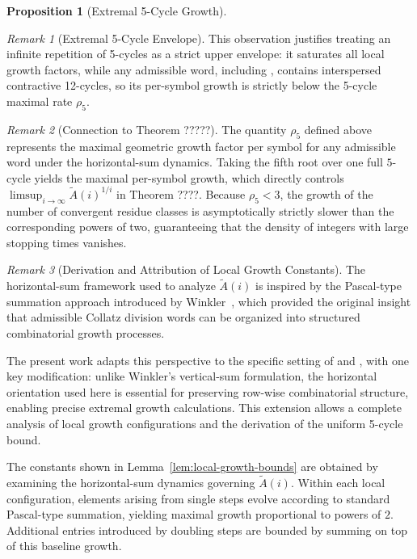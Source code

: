 \documentclass[12pt, oneside]{article}
\numberwithin{equation}{section}
\theoremstyle{definition}
\newtheorem{proposition}{Proposition}[section]
\theoremstyle{plain}
\theoremstyle{remark}
\newtheorem*{remark}{Remark}
\begin{document}
\begin{proposition}[Extremal 5-Cycle Growth]
\begin{remark}[Extremal 5-Cycle Envelope]
This observation justifies treating an infinite repetition of 5-cycles as a strict upper envelope: 
it saturates all local growth factors, while any admissible word, including , 
contains interspersed contractive 12-cycles, so its per-symbol growth is strictly below 
the 5-cycle maximal rate $\rho_5$.
\end{remark}

\begin{remark}[Connection to Theorem ?????]
The quantity \(\rho_5\) defined above represents the maximal geometric growth factor
per symbol for any admissible word under the horizontal-sum dynamics.  Taking the fifth
root over one full $5$-cycle yields the maximal per-symbol growth, which directly controls 
\(\limsup_{i\to\infty} \widetilde A(i)^{1/i}\) in Theorem ????. 
Because \(\rho_5 < 3\), the growth of the number of convergent residue classes is
asymptotically strictly slower than the corresponding powers of two, guaranteeing
that the density of integers with large stopping times vanishes.
\end{remark}

\begin{remark}[Derivation and Attribution of Local Growth Constants]
The horizontal-sum framework used to analyze $\widetilde A(i)$ is inspired by
the Pascal-type summation approach introduced by Winkler~\cite{Winkler2017},
which provided the original insight that admissible Collatz division words can
be organized into structured combinatorial growth processes.  

The present work adapts this perspective to the specific setting of
 and , with one key modification: unlike
Winkler's vertical-sum formulation, the horizontal orientation used here is
essential for preserving row-wise combinatorial structure, enabling precise
extremal growth calculations. This extension allows a complete analysis of
local growth configurations and the derivation of the uniform 5-cycle bound.

The constants shown in Lemma~\ref{lem:local-growth-bounds} are obtained by
examining the horizontal-sum dynamics governing $\widetilde A(i)$.
Within each local configuration, elements arising from single steps evolve
according to standard Pascal-type summation, yielding maximal growth
proportional to powers of $2$. Additional entries introduced by doubling steps
are bounded by summing on top of this baseline growth.


\end{remark}
\end{proposition}
\end{document}
